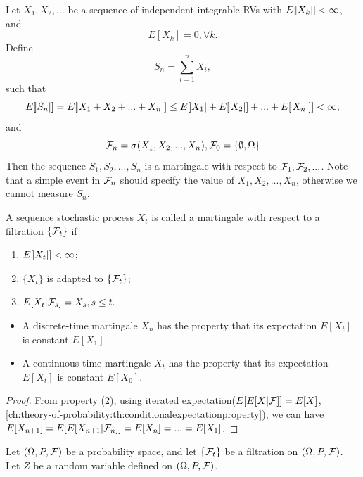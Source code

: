 \begin{refsection}
\begin{example}
	Let $X_1,X_2,...$ be a sequence of independent integrable RVs with $E[\abs{X_k}] < \infty$, and 
	$$E[X_k] = 0,\forall k.$$
	Define $$S_n = \sum_{i=1}^n X_i,$$ such that
	$$E[\abs{S_n}] = E[\abs{X_1+X_2+...+X_n}] \leq E[\abs{X_1} +E[\abs{X_2}]+...+E[\abs{X_n}]] < \infty;$$
	and
	$$\mathcal{F}_n = \sigma(X_1,X_2,...,X_n),\mathcal{F}_0 = \{\emptyset,\Omega\}$$
	Then the sequence $S_1,S_2,...,S_n$ is a martingale with respect to $\mathcal{F}_1,\mathcal{F}_2,...$.
	Note that a simple event in $\mathcal{F}_n$ should specify the value of $X_1,X_2,...,X_n$, otherwise we cannot measure $S_n$.
\end{example}



\begin{definition}\cite[49]{brzezniak1999basic}
	A sequence stochastic process $X_t$ is called a martingale with respect to a filtration $\{\mathcal{F}_t\}$ if 
	\begin{enumerate}
		\item $E[\abs{X_t}] < \infty$;
		\item $\{X_t\}$ is adapted to $\{\mathcal{F}_t\}$; 
		\item $E[X_{t}|\mathcal{F}_s] = X_s, s\leq t.$
	\end{enumerate}
\end{definition}

\begin{lemma}\label{ch:theory-of-stochastic-process:th:martingaleconstantexpectation}\hfill
\begin{itemize}
	\item A discrete-time martingale $X_n$ has the property that its expectation $E[X_t]$ is constant $E[X_1]$.
	\item  A continuous-time martingale $X_t$ has the property that its expectation $E[X_t]$ is constant $E[X_0]$.
\end{itemize}	

\end{lemma}
\begin{proof}
From property (2), using iterated expectation($E[E[X|\mathcal{F}]]=E[X]$,\autoref{ch:theory-of-probability:th:conditionalexpectationproperty}), we can have $E[X_{n+1}] = E[E[X_{n+1}|\mathcal{F}_n]] = E[X_n] = ... = E[X_1]$. 
\end{proof}




\begin{theorem}\label{ch:theory-of-stochastic-process:th:conditionalexpectationasMartingale}
Let $(\Omega, P,\mathcal{F})$ be a probability space, and let $\{\mathcal{F}_t\}$ be a filtration on $(\Omega, P,\mathcal{F})$. Let $Z$ be a random variable defined on $(\Omega, P,\mathcal{F})$. 


\end{theorem}
\end{refsection}
